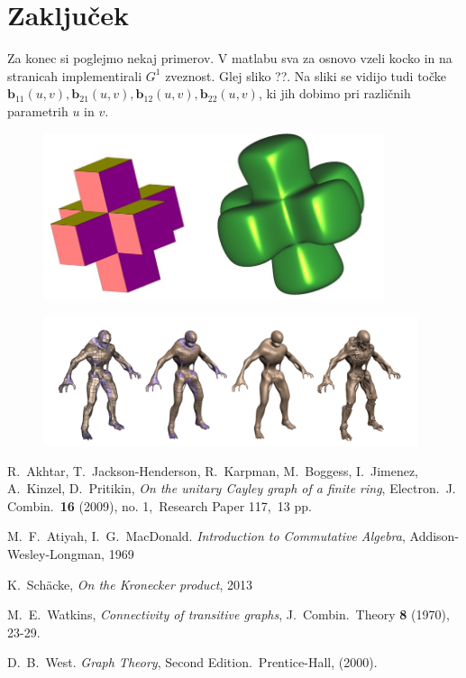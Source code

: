 \documentclass[a4paper,12pt]{article}
\newcommand{\tbf}{\textbf}
\begin{document}
\section{Zaključek}
Za konec si poglejmo nekaj primerov. V matlabu sva za osnovo vzeli kocko in na stranicah implementirali $G^1$ zveznost. Glej sliko ??. Na sliki se vidijo tudi točke $\tbf{b}_{11}(u,v),
\tbf{b}_{21}(u,v), \tbf{b}_{12}(u,v), \tbf{b}_{22}(u,v)$, ki jih dobimo pri različnih parametrih $u$ in $v$.


\begin{figure}[h]
	\centering
	\includegraphics[width=10cm]{posebna_kocka.jpg}
\end{figure}


\begin{figure}[h]
	\centering
	\includegraphics[width=11cm]{koncni_primer.png}
\end{figure}

\begin{thebibliography}{99}
	
	R.~Akhtar, T.~Jackson-Henderson, R.~Karpman, M.~Boggess, I.~Jimenez, A.~Kinzel, D.~Pritikin, \emph{On the unitary Cayley graph of a finite ring}, Electron.\ J. Combin.\ \textbf{16} (2009), no. 1,\ Research Paper 117,\ 13 pp.
	
	M.~F.~Atiyah, I.~G.~MacDonald. \emph{Introduction to Commutative Algebra}, Addison-Wesley-Longman, 1969
	
	
	K.~Schäcke, \emph{On the Kronecker product}, 2013
	
	M.~E.~Watkins, \emph{Connectivity of transitive graphs}, J.~Combin.\ Theory \textbf{8} (1970), 23-29.
	
	D.~B.~West. \emph{Graph Theory}, Second Edition.\ Prentice-Hall, (2000).
	
\end{thebibliography}
\end{document}
